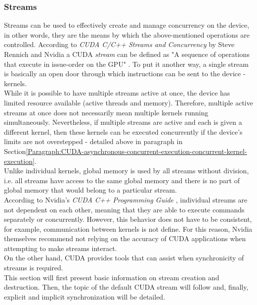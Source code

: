 \subsubsection{Streams}\label{Subsubsection:CUDA-asynchronous-concurrent-execution-concurrent-streams}
Streams can be used to effectively create and manage concurrency on the device, in other words, they are the means by which the above-mentioned operations are controlled. According to \emph{CUDA C/C++ Streams and Concurrency} by Steve Rennich and Nvidia a CUDA \textit{stream} can be defined as "A sequence of operations that execute in issue-order on the GPU" \cite{sk7jHd5INXJOAEUe}. To put it another way, a single stream is basically an open door through which instructions can be sent to the device - kernels. \\
While it is possible to have multiple streams active at once, the device has limited resource available (active threads and memory). Therefore, multiple active streams at once does not necessarily mean multiple kernels running simultaneously. Nevertheless, if multiple streams are active and each is given a different kernel, then these kernels can be executed concurrently if the device's limits are not overstepped - detailed above in paragraph \textit{} in Section\ref{Paragraph:CUDA-asynchronous-concurrent-execution-concurrent-kernel-execution}. \\
Unlike individual kernels, global memory is used by all streams without division, i.e. all streams have access to the same global memory and there is no part of global memory that would belong to a particular stream. \\
According to Nvidia's \emph{CUDA C++ Programming Guide} \cite{NVIDIAMay2022}, individual streams are not dependent on each other, meaning that they are able to execute commands separately or concurrently. However, this behavior does not have to be consistent, for example, communication between kernels is not define. For this reason, Nvidia themselves recommend not relying on the accuracy of CUDA applications when attempting to make streams interact. \\
On the other hand, CUDA provides tools that can assist when synchronicity of streams is required. \\
This section will first present basic information on stream creation and destruction. Then, the topic of the default CUDA stream will follow and, finally, explicit and implicit synchronization will be detailed.


